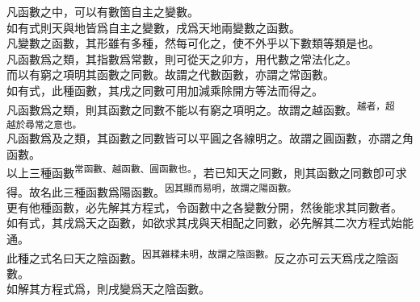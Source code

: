 \begin{enumerate} [label={第\chinese*款}]
	凡函數之中，可以有數箇自主之變數。\\
	如有式\CJKmove 則天與地皆爲自主之變數，戌爲天地兩變數之函數。\\
	凡變數之函數，其形雖有多種，然每可化之，使不外乎以下數類\CJKmove 等類是也。\\
	凡函數爲\CJKmove 之類，其指數爲常數，則可從天之卯方，用代數之常法化之。\\
	而以有窮之項明其函數之同數。故謂之代數函數，亦謂之常函數。\\
	如有式\CJKmove，此種函數，其戌之同數可用加減乘除開方等法而得之。\\
	凡函數爲\CJKmove 之類，則其函數之同數不能以有窮之項明之。故謂之越函數。\textsuperscript{越者，超}\\\textsuperscript{越於尋常之意也。}\\
	凡函數爲\CJKmove 及\CJKmove 之類，其函數之同數皆可以平圓之各線明之。故謂之圓函數，亦謂之角函數。\\
	以上三種函數\textsuperscript{常函數、越函數、圓函數也。}，若已知天之同數，則其函數之同數卽可求得。故名此三種函數爲陽函數。\textsuperscript{因其顯而易明，故謂之陽函數。}\\
	更有他種函數，必先解其方程式，令函數中之各變數分開，然後能求其同數者。\\
	如有式\CJKmove，其戌爲天之函數，如欲求其戌與天相配之同數，必先解其二次方程式始能通。\\
	此種之式名曰天之陰函數。\textsuperscript{因其雜糅未明，故謂之陰函數。}反之亦可云天爲戌之陰函數。\\
	如解其方程式爲\CJKmove，則戌變爲天之陰函數。\\

\end{enumerate}
